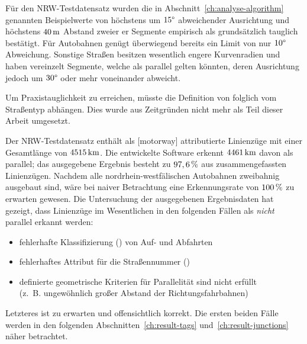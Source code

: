 \documentclass[../main/thesis.tex]{subfiles}
\begin{document}
Für den NRW-Testdatensatz wurden die in Abschnitt~\ref{ch:analyse-algorithm} genannten Beispielwerte von höchstens um $15\degree$ abweichender Ausrichtung und höchstens $\unit[40]{m}$ Abstand zweier er Segmente empirisch als grundsätzlich tauglich bestätigt.
Für Autobahnen genügt überwiegend bereits ein Limit von nur $10\degree$ Abweichung.
Sonstige Straßen besitzen wesentlich engere Kurvenradien und haben vereinzelt Segmente, welche als parallel gelten könnten, deren Ausrichtung jedoch um $30\degree$ oder mehr voneinander abweicht.



Um Praxistauglichkeit zu erreichen, müsste die Definition von  folglich vom Straßentyp abhängen.
Dies wurde aus Zeitgründen nicht mehr als Teil dieser Arbeit umgesetzt.

Der NRW-Testdatensatz enthält als [motorway] attributierte Linienzüge mit einer Gesamtlänge von $\unit[4515]{km}$.
Die entwickelte Software erkennt $\unit[4461]{km}$ davon als parallel; das ausgegebene Ergebnis besteht zu $\unit[97,6]{\%}$ aus zusammengefassten Linienzügen.
Nachdem alle nordrhein-westfälischen Autobahnen zweibahnig ausgebaut sind, wäre bei naiver Betrachtung eine Erkennungsrate von $\unit[100]{\%}$ zu erwarten gewesen.
Die Untersuchung der ausgegebenen Ergebnisdaten hat gezeigt, dass Linienzüge im Wesentlichen in den folgenden Fällen als \emph{nicht} parallel erkannt werden:

\begin{itemize}[nosep]
\item fehlerhafte Klassifizierung () von Auf- und Abfahrten
\item fehlerhaftes Attribut für die Straßennummer ()
\item definierte geometrische Kriterien für Parallelität sind nicht erfüllt \\(z.~B. ungewöhnlich großer Abstand der Richtungsfahrbahnen)
\end{itemize}
%
Letzteres ist zu erwarten und offensichtlich korrekt.
Die ersten beiden Fälle werden in den folgenden Abschnitten~\ref{ch:result-tags} und~\ref{ch:result-junctions} näher betrachtet.
\end{document}
